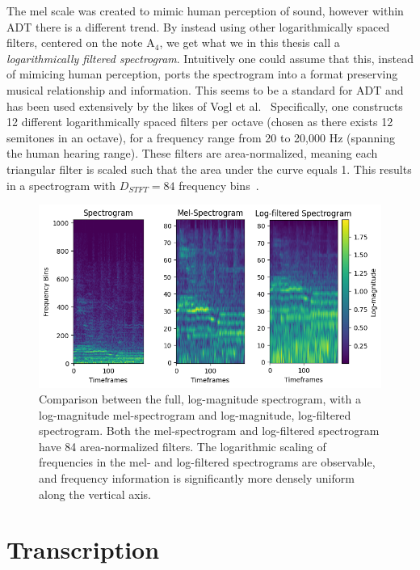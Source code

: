The mel scale was created to mimic human perception of sound, however within \gls{ADT} there is a different trend. By instead using other logarithmically spaced filters, centered on the note $\text{A}_4$, we get what we in this thesis call a \textit{logarithmically filtered spectrogram}. Intuitively one could assume that this, instead of mimicing human perception, ports the spectrogram into a format preserving musical relationship and information. This seems to be a standard for \gls{ADT} and has been used extensively by the likes of Vogl et al.~\cite{Vogl2017DrumTV, vogl2018multiinstrumentdrumtranscription} Specifically, one constructs 12 different logarithmically spaced filters per octave (chosen as there exists 12 semitones in an octave), for a frequency range from 20 to 20,000 Hz (spanning the human hearing range). These filters are area-normalized, meaning each triangular filter is scaled such that the area under the curve equals 1. This results in a spectrogram with $D_{STFT} = 84$ frequency bins~\cite{8350302, signals4040042}.

\begin{figure}[H]
    \centering
    \hspace*{-0.6cm}
    \includegraphics[scale=0.9]{figures/allspectrograms}
    \caption{Comparison between the full, log-magnitude spectrogram, with a log-magnitude mel-spectrogram and log-magnitude, log-filtered spectrogram. Both the mel-spectrogram and log-filtered spectrogram have 84 area-normalized filters. The logarithmic scaling of frequencies in the mel- and log-filtered spectrograms are observable, and frequency information is significantly more densely uniform along the vertical axis.}
    \label{AllSpectrogramFigure}
\end{figure}


\section{Transcription}

